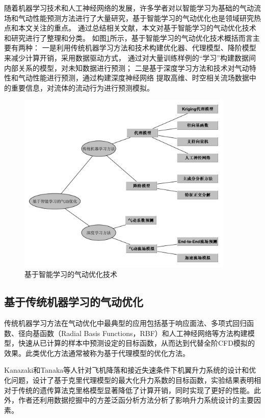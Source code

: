 随着机器学习技术和人工神经网络的发展，许多学者对以智能学习为基础的气动流场和气动性能预测方法进行了大量研究，基于智能学习的气动优化也是领域研究热点和本文关注的重点。
通过总结相关文献，本文对基于智能学习的气动优化技术和研究进行了整理和分类。
如图\ref{fig:智能优化}所示，基于智能学习的气动优化技术概括而言主要有两种：
一是利用传统机器学习方法和技术构建优化器、代理模型、降阶模型来减少计算开销，采用数据驱动方式，
通过对大量训练样例的“学习”构建数据间内部关系的模型，对未知数据进行预测；
二是基于深度学习方法和技术对气动特性和气动性能进行预测，通过构建深度神经网络
提取高维、时空相关流场数据中的重要信息，对流体的流动行为进行预测模拟。

\begin{figure}[htp]
	\centering
	\includegraphics[width=0.92\textwidth]{figures/aicfd.pdf}
	\caption{基于智能学习的气动优化技术}
	\label{fig:智能优化}
\end{figure}

\subsection{基于传统机器学习的气动优化}
传统机器学习方法在气动优化中最典型的应用包括基于响应面法、多项式回归函数、径向基函数（Radial Basis Functions，RBF）和人工神经网络等方法构建模型，快速从已计算的样本中预测设定的目标函数，从而达到代替全阶CFD模拟的效果。此类优化方法通常被称为基于代理模型的优化方法。

Kanazaki和Tanaka等人\cite{Kanazaki2007Multi}针对飞机降落和接近失速条件下机翼升力系统的设计和优化问题，设计了基于克里代理模型的最大化升力系数的目标函数，实验结果表明相对于传统的遗传算法克里格模型显著降低了计算开销，同时实现了更好的性能。此外，作者还利用数据挖掘中的方差泛函分析方法分析了影响升力系统设计的主要因素。


